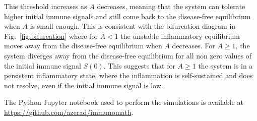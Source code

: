 \documentclass[a4paper, 12pt]{article}
\begin{document}
 This threshold increases as $A$ decreases, meaning that the system can tolerate higher initial immune signals and still come back  to the disease-free equilibrium when $A$ is small enough.
  This is consistent with the bifurcation diagram in Fig.~\ref{fig:bifurcation} where for $A<1$ the unstable inflammatory equilibrium moves away from the disease-free equilibrium when $A$ decreases.
 For $A\geq 1$, the system diverges away from the disease-free equilibrium for all non zero values of the initial immune signal $S(0)$.
  This suggests that for $A\geq 1$ the system is in a persistent inflammatory state, where the  inflammation is self-sustained and does not resolve, even if the initial immune signal is low.


The Python Jupyter notebook used to perform the simulations is available at \url{https://github.com/azerad/immunomath}.
\end{document}
